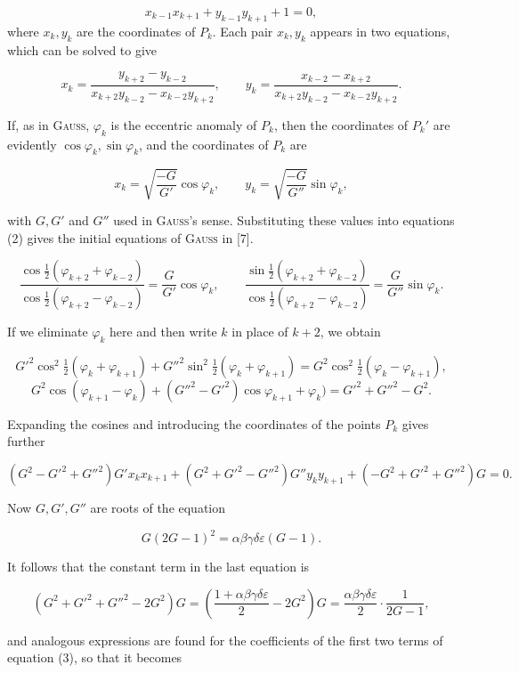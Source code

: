 \[
x_{k-1}x_{k+1} + y_{k-1}y_{k+1} + 1 = 0,\tag{1}
\]
where $x_k, y_k$ are the coordinates of $P_k$. Each pair $x_k, y_k$ appears in two
equations, which can be solved to give

\[
x_k = \dfrac{y_{k+2}-y_{k-2}}{x_{k+2}y_{k-2}-x_{k-2}y_{k+2}}, \qquad
y_k = \dfrac{x_{k-2}-x_{k+2}}{x_{k+2}y_{k-2}-x_{k-2}y_{k+2}}.\tag{2}
\]

If, as in \textsc{Gauss}, $\varphi_k$ is the eccentric anomaly of $P_k$, then the
coordinates of $P_k'$ are evidently $\cos\varphi_k, \sin\varphi_k$, and the
coordinates of $P_k$ are

\[
x_k = \sqrt{\dfrac{-G}{G'}}\cos\varphi_k, \qquad y_k = \sqrt{\dfrac{-G}{G''}}\sin\varphi_k,
\]

with $G, G'$ and $G''$ used in \textsc{Gauss}'s sense. Substituting these values into
equations (2) gives the initial equations of \textsc{Gauss} in [7].

\[
\dfrac{\cos\frac{1}{2}(\varphi_{k+2}+\varphi_{k-2})}{\cos\frac{1}{2}(\varphi_{k+2}-\varphi_{k-2})}
= \dfrac{G}{G'}\cos\varphi_k, \qquad
\dfrac{\sin\frac{1}{2}(\varphi_{k+2}+\varphi_{k-2})}{\cos\frac{1}{2}(\varphi_{k+2}-\varphi_{k-2})}
= \dfrac{G}{G''}\sin\varphi_k.
\]

If we eliminate $\varphi_k$ here and then write $k$ in place of $k+2$, we obtain

\[
G'^2\cos^2\tfrac{1}{2}(\varphi_k+\varphi_{k+1}) + G''^2\sin^2\tfrac{1}{2}(\varphi_k+\varphi_{k+1})
= G^2\cos^2\tfrac{1}{2}(\varphi_k-\varphi_{k+1}),
\]
\[
G^2\cos(\varphi_{k+1}-\varphi_k) + (G''^2-G'^2)\cos\varphi_{k+1}+\varphi_k) = G'^2+G''^2-G^2.
\]

Expanding the cosines and introducing the coordinates of the points $P_k$ gives further

\[
(G^2-G'^2+G''^2)G'x_kx_{k+1} + (G^2+G'^2-G''^2)G''y_ky_{k+1} +
(-G^2+G'^2+G''^2)G = 0.\tag{3}
\]

Now $G, G', G''$ are roots of the equation

\[
G(2G-1)^2 = \alpha\beta\gamma\delta\varepsilon(G-1).
\]

It follows that the constant term in the last equation is

\[
(G^2+G'^2+G''^2-2G^2)G = \left(\dfrac{1+\alpha\beta\gamma\delta\varepsilon}{2} - 2G^2\right)G
= \dfrac{\alpha\beta\gamma\delta\varepsilon}{2}\cdot\dfrac{1}{2G-1},
\]

and analogous expressions are found for the coefficients of the first two terms of
equation (3), so that it becomes

